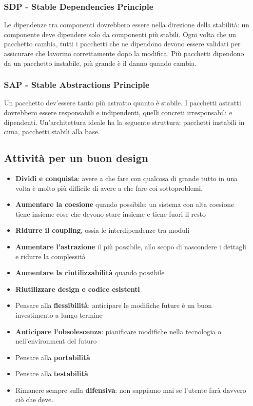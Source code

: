 \documentclass[11pt]{article}
\begin{document}
\subsubsection{SDP - Stable Dependencies Principle}
Le dipendenze tra componenti dovrebbero essere nella direzione della stabilità: un componente deve dipendere solo da componenti più stabili. Ogni volta che un pacchetto cambia, tutti i pacchetti che ne dipendono devono essere validati per assicurare che lavorino correttamente dopo la modifica. Più pacchetti dipendono da un pacchetto instabile, più grande è il danno quando cambia.
\subsubsection{SAP - Stable Abstractions Principle}
Un pacchetto dev'essere tanto più astratto quanto è stabile. I pacchetti astratti dovrebbero essere responsabili e indipendenti, quelli concreti irresponsabili e dipendenti. Un'architettura ideale ha la seguente struttura: pacchetti instabili in cima, pacchetti stabili alla base. 
\subsection{Attività per un buon design}
\begin{itemize}
    \item \textbf{Dividi e conquista}: avere a che fare con qualcosa di grande tutto in una volta è molto più difficile di avere a che fare coi sottoproblemi. 
    \item \textbf{Aumentare la coesione} quando possibile: un sistema con alta coesione tiene insieme cose che devono stare insieme e tiene fuori il resto
    \item \textbf{Ridurre il coupling}, ossia le interdipendenze tra moduli
    \item \textbf{Aumentare l'astrazione} il più possibile, allo scopo di nascondere i dettagli e ridurre la complessità
    \item \textbf{Aumentare la riutilizzabilità} quando possibile
    \item \textbf{Riutilizzare design e codice esistenti}
    \item Pensare alla \textbf{flessibilità}: anticipare le modifiche future è un buon investimento a lungo termine
    \item \textbf{Anticipare l'obsolescenza}: pianificare modifiche nella tecnologia o nell'environment del futuro 
    \item Pensare alla \textbf{portabilità}
    \item Pensare alla \textbf{testabilità}
    \item Rimanere sempre sulla \textbf{difensiva}: non sappiamo mai se l'utente farà davvero ciò che deve.
\end{itemize}
\end{document}

